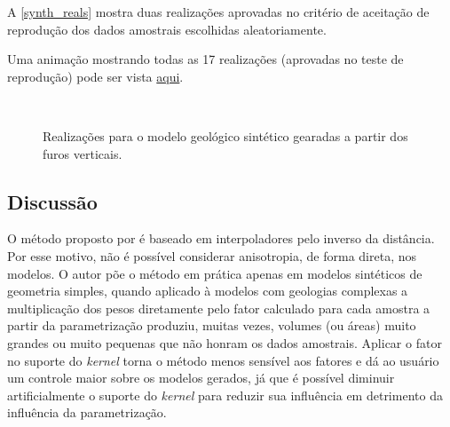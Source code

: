 A \autoref{synth_reals} mostra duas realizações aprovadas no critério de aceitação de reprodução dos dados amostrais escolhidas aleatoriamente.

Uma animação mostrando todas as 17 realizações (aprovadas no teste de reprodução) pode ser vista \href{https://github.com/robertorolo/kernel_support_parametrization_uncertainty_assess/blob/main/sec_hole_10.gif}{aqui}.

\begin{figure}[H] 
    \centering
    \caption{Realizações para o modelo geológico sintético gearadas a partir dos furos verticais.} \label{synth_reals}
     \\
\end{figure}

\subsection{Discussão}

O método proposto por  é baseado em interpoladores pelo inverso da distância. Por esse motivo, não é possível considerar anisotropia, de forma direta, nos modelos. O autor põe o método em prática apenas em modelos sintéticos de geometria simples, quando aplicado à modelos com geologias complexas a multiplicação dos pesos diretamente pelo fator calculado para cada amostra a partir da parametrização produziu, muitas vezes, volumes (ou áreas) muito grandes ou muito pequenas que não honram os dados amostrais. Aplicar o fator no suporte do \textit{kernel} torna o método menos sensível aos fatores e dá ao usuário um controle maior sobre os modelos gerados, já que é possível diminuir artificialmente o suporte do \textit{kernel} para reduzir sua influência em detrimento da influência da parametrização.

